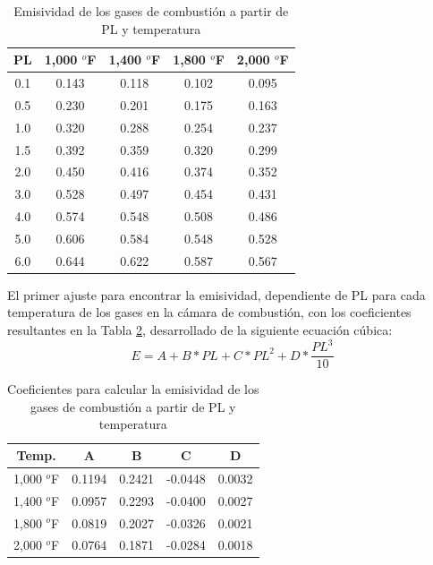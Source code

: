 \begin{table}[H]
\caption{Emisividad de los gases de combustión a partir de PL y temperatura}
\label{tbl:pl}
\centering
\begin{tabular}{c|c|c|c|c}
PL	& 1,000 $^o$F   & 1,400 $^o$F   & 1,800 $^o$F   & 2,000 $^o$F\\
\hline
0.1	& 0.143	        & 0.118	        & 0.102	        & 0.095\\
0.5	& 0.230	        & 0.201	        & 0.175	        & 0.163\\
1.0	& 0.320	        & 0.288	        & 0.254	        & 0.237\\
1.5	& 0.392	        & 0.359	        & 0.320         & 0.299\\
2.0	& 0.450	        & 0.416	        & 0.374	        & 0.352\\
3.0	& 0.528	        & 0.497	        & 0.454	        & 0.431\\
4.0	& 0.574	        & 0.548	        & 0.508	        & 0.486\\
5.0	& 0.606	        & 0.584	        & 0.548	        & 0.528\\
6.0	& 0.644	        & 0.622	        & 0.587	        & 0.567\\
\end{tabular}
\end{table}
\par El primer ajuste para encontrar la emisividad, dependiente de PL para cada temperatura de los gases en la cámara de combustión, con los coeficientes resultantes en la Tabla \ref{tbl:emisividad}, desarrollado de la siguiente ecuación cúbica:
\begin{equation}
\label{eq:emisividad}
E = A + B*PL + C*PL^2 + D*\frac{PL^3}{10}
\end{equation}
\begin{table}[H]
\caption{Coeficientes para calcular la emisividad de los gases de combustión a partir de PL y temperatura}
\label{tbl:emisividad}
\centering
\begin{tabular}{c|c|c|c|c}		
Temp.	    & A	        & B	        & C 	    & D     \\
\hline
1,000 $^o$F	& 0.1194	& 0.2421	& -0.0448	& 0.0032\\
1,400 $^o$F	& 0.0957	& 0.2293	& -0.0400	& 0.0027\\
1,800 $^o$F	& 0.0819	& 0.2027	& -0.0326	& 0.0021\\
2,000 $^o$F	& 0.0764	& 0.1871	& -0.0284	& 0.0018\\
\end{tabular}
\end{table}

